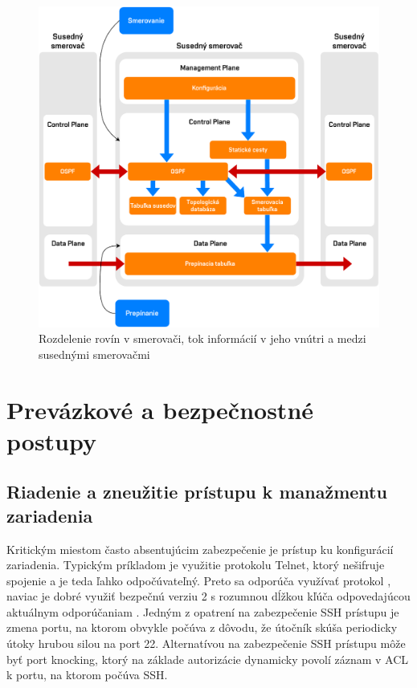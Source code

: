 \begin{figure}[H]
	\begin{center}
		\includegraphics[scale=0.6]{obrazky/SDN_planes.pdf}
	\end{center}
	\caption[Rozdelenie rovín v smerovači, tok informácií v jeho vnútri a medzi susednými smerovačmi]{Rozdelenie rovín v smerovači, tok informácií v jeho vnútri a medzi susednými smerovačmi \cite{Pepelnjak2013}}
	\label{fig:sdn-planes}
\end{figure} 


\section{Prevázkové a bezpečnostné postupy}

\subsection*{Riadenie a zneužitie prístupu k manažmentu zariadenia}
Kritickým miestom často absentujúcim zabezpečenie je prístup ku konfigurácií zariadenia. Typickým príkladom je využitie protokolu Telnet, ktorý nešifruje spojenie a je teda ľahko odpočúvateľný. Preto sa odporúča využívať protokol , naviac je dobré využiť bezpečnú verziu 2 s rozumnou dĺžkou kľúča odpovedajúcou aktuálnym odporúčaniam \cite{CIS_DrTLsgXv24lxeIIM} \cite{Barker2019}. Jedným z opatrení na zabezpečenie SSH prístupu je zmena portu, na ktorom obvykle počúva z dôvodu, že útočník skúša periodicky útoky hrubou silou na  port 22. Alternatívou na zabezpečenie SSH prístupu môže byť port knocking, ktorý na základe autorizácie dynamicky povolí záznam v ACL k portu, na ktorom počúva SSH.

